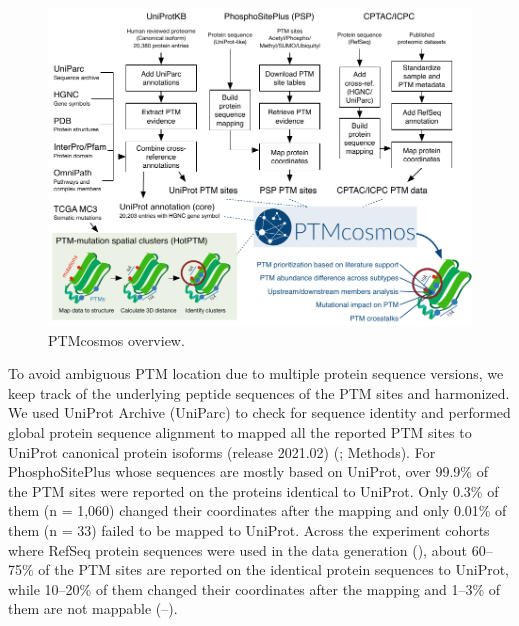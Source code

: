 \begin{figure}[tb]
    \centering
    \includegraphics[width=0.9\linewidth]{figures/chap03_ptmcosmos/figure1_ptmcosmos_workflow.pdf}
    \caption[PTMcosmos overview.]{PTMcosmos overview.}
    \label{fig:ptmcosmos-workflow}
\end{figure}

To avoid ambiguous PTM location due to multiple protein sequence versions, we keep track of the underlying peptide sequences of the PTM sites and harmonized. We used UniProt Archive (UniParc) \cite{leinonenr_apweilerr:UniProtArchive2004} to check for sequence identity and performed global protein sequence alignment to mapped all the reported PTM sites to UniProt canonical protein isoforms (release 2021.02) (; Methods). For PhosphoSitePlus whose sequences are mostly based on UniProt, over 99.9\% of the PTM sites were reported on the proteins identical to UniProt. Only 0.3\% of them (n = 1,060) changed their coordinates after the mapping and only 0.01\% of them (n = 33) failed to be mapped to UniProt. Across the experiment cohorts where RefSeq protein sequences were used in the data generation (), about 60--75\% of the PTM sites are reported on the identical protein sequences to UniProt, while 10--20\% of them changed their coordinates after the mapping and 1--3\% of them are not mappable (--).

